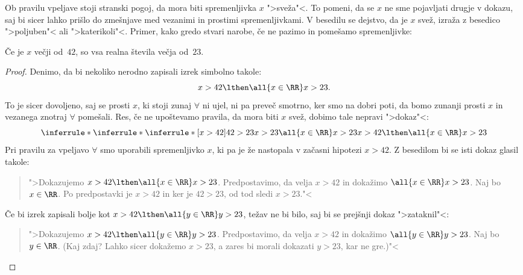 Ob pravilu vpeljave stoji stranski pogoj, da mora biti spremenljivka
$x$ ">sveža"<. To pomeni, da se $x$ ne sme pojavljati drugje v dokazu,
saj bi sicer lahko prišlo do zmešnjave med vezanimi in prostimi
spremenljivkami. V besedilu se dejstvo, da je $x$ svež, izraža z
besedico ">poljuben"< ali ">katerikoli"<. Primer, kako gredo stvari
narobe, če ne pazimo in pomešamo spremenljivke:

\begin{izrek}
  Če je $x$ večji od~$42$, so vsa realna števila večja od~$23$.
\end{izrek}

\begin{proof}
  Denimo, da bi nekoliko nerodno zapisali izrek simbolno takole:
  \begin{equation*}
    x > 42 \lthen \all{x \in \RR} x > 23.
  \end{equation*}
  To je sicer dovoljeno, saj se prosti $x$, ki stoji zunaj $\forall$
  ni ujel, ni pa preveč smotrno, ker smo na dobri poti, da bomo
  zunanji prosti $x$ in vezanega znotraj $\forall$ pomešali. Res, če
  ne upoštevamo pravila, da mora biti $x$ svež, dobimo tale nepravi
  ">dokaz"<:
  \begin{equation*}
    \inferrule*
    {
      \inferrule*
      {\inferrule*
        {[x > 42] \\ 42 > 23}
        {x > 23}
      }
      {\all{x \in \RR} x > 23}
    }
    {x > 42 \lthen \all{x \in \RR} x > 23}
  \end{equation*}
  Pri pravilu za vpeljavo $\forall$ smo uporabili spremenljivko $x$,
  ki pa je že nastopala v začasni hipotezi $x > 42$. Z besedilom bi se
  isti dokaz glasil takole:
  \begin{quote}
    ">Dokazujemo $x > 42 \lthen \all{x \in \RR} x > 23$. Predpostavimo,
    da velja $x > 42$ in dokažimo $\all{x \in \RR} x > 23$. Naj bo $x
    \in \RR$. Po predpostavki je $x > 42$ in ker je $42 > 23$, od tod
    sledi $x > 23$."<
  \end{quote}
  Če bi izrek zapisali bolje kot $x > 42 \lthen \all{y \in \RR} y >
    23$, težav ne bi bilo, saj bi se prejšnji dokaz ">zataknil"<:
  \begin{quote}
    ">Dokazujemo $x > 42 \lthen \all{y \in \RR} y > 23$. Predpostavimo,
    da velja $x > 42$ in dokažimo $\all{y \in \RR} y > 23$. Naj bo $y
    \in \RR$. (Kaj zdaj? Lahko sicer dokažemo $x > 23$, a zares bi
    morali dokazati $y > 23$, kar ne gre.)"<
  \end{quote}
\end{proof}

